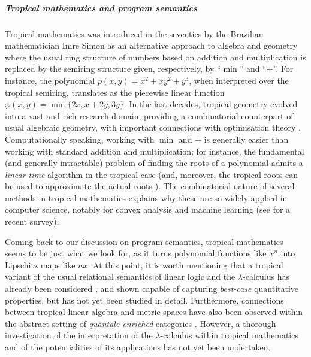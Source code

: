 \subparagraph*{Tropical mathematics and program semantics } 

Tropical mathematics was introduced in the seventies by the Brazilian mathematician Imre Simon \cite{Simon} as an alternative approach to algebra and geometry where the usual ring structure of numbers based on addition and multiplication is replaced by the semiring structure given, respectively, by ``$\min$'' and ``$+$''.
%
%
For instance, the polynomial $p(x,y)=x^{2}+xy^{2}+y^{3}$, when interpreted over the tropical semiring, translates as the piecewise linear function
$
\varphi(x,y)=\min\{2x, x+2y, 3y\}
$.
In the last decades, tropical geometry evolved into a vast and rich research domain, providing a combinatorial counterpart of usual algebraic geometry, with important connections with optimisation theory \cite{Sturmfelds}.
Computationally speaking, working with $\min$ and $+$ is generally easier than working with standard addition and multiplication; for instance, the fundamental (and generally intractable) problem of finding the roots of a polynomial admits a \emph{linear time} algorithm in the tropical case (and, moreover,  the tropical roots can be used to approximate the actual roots \cite{Noferini2015}).
The combinatorial nature of several methods in tropical mathematics explains why these are so widely applied in computer science, notably for convex analysis and machine learning (see \cite{Maragos2021} for a recent survey).


Coming back to our discussion on program semantics, tropical mathematics seems to be just  what we look for, as it turns polynomial functions like $x^{n}$ into Lipschitz maps like $n x$.
At this point, it is worth mentioning that a tropical variant of the usual relational semantics of linear logic and the $\lambda$-calculus has already been considered \cite{Manzo2013}, and shown capable of capturing \emph{best-case} quantitative properties, but has not yet been studied in detail. Furthermore, connections between tropical linear algebra and metric spaces have also been observed \cite{Fuji} within the abstract setting of \emph{quantale-enriched} categories \cite{Hofmann2014, Stubbe2014}.
However, a thorough investigation of the interpretation of the $\lambda$-calculus within tropical mathematics and of the potentialities of its applications has not yet been undertaken. 

